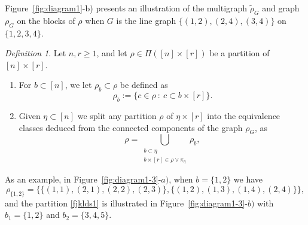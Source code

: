 \documentclass[bj,authoryear,noshowframe]{imsart}
\theoremstyle{plain}
\theoremstyle{remark}
\newtheorem{definition}[theorem]{Definition}
\begin{document}
\noindent
 Figure~\ref{fig:diagram1}-b) presents an illustration of the
multigraph $\widetilde{\rho}_G$ and graph $\rho_G$ on the blocks of $\rho$ when
$G$ is the line graph
$\{(1,2),(2,4),(3,4)\}$ on $\{1,2,3,4\}$. %

\begin{definition}
  Let $n , r \geq 1$,
  and let $\rho \in \Pi ([n]\times [r])$ be a partition of $[n]\times [r]$.
  \begin{enumerate}%
  \item
    For $b \subset [n]$, we let $\rho_b \subset \rho$ be defined as 
$$
\rho_b := \{ c \in \rho \ : \ c \subset b\times[r] \}. 
$$
\item Given $\eta \subset [n]$ 
 we split any partition $\rho$ of $\eta\times[r]$ into the equivalence classes
 deduced from the connected components of the graph $\rho_G$, as 
\begin{equation}
\label{fjklds1} 
\rho = \bigcup_{\substack{b\subset\eta\\b\times [r] \in \rho \vee \pi_\eta}} \rho_b, 
\end{equation} 
\end{enumerate}
\end{definition} 
 As an example, in Figure~\ref{fig:diagram1-3}-$a)$, when $b = \{1,2\}$ we have
$$
\rho_{\{1,2\}} = \big\{\{(1,1),(2,1),(2,2),(2,3)\},
\{(1,2),(1,3),(1,4),(2,4)\}\big\}, 
$$
and the partition \eqref{fjklds1} is
illustrated in Figure~\ref{fig:diagram1-3}-$b)$ with
 $b_1 = \{ 1,2\}$ and $b_2 = \{3,4,5\}$. 

\end{document}
